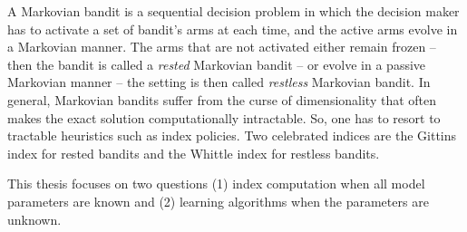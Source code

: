 A Markovian bandit is a sequential decision problem in which the decision maker has to activate a set of bandit's arms at each time, and the active arms evolve in a Markovian manner.
The arms that are not activated either remain frozen -- then the bandit is called a \emph{rested} Markovian bandit -- or evolve in a passive Markovian manner -- the setting is then called \emph{restless} Markovian bandit.
In general, Markovian bandits suffer from the curse of dimensionality that often makes the exact solution computationally intractable.
So, one has to resort to tractable heuristics such as index policies.
Two celebrated indices are the Gittins index for rested bandits and the Whittle index for restless bandits.

This thesis focuses on two questions (1) index computation when all model parameters are known and (2) learning algorithms when the parameters are unknown.

